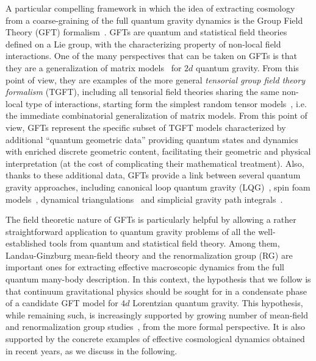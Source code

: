 \documentclass[11pt,a4paper]{article}
\begin{document}
A particular compelling framework in which the idea of extracting cosmology from a coarse-graining of the full quantum gravity dynamics is the Group Field Theory (GFT) formalism~\cite{Freidel:2005qe,Oriti:2011jm,Oriti:2007qd}. GFTs are quantum and statistical field theories defined on a Lie group, with the characterizing property of non-local field interactions. One of the many perspectives that can be taken on GFTs is that they are a generalization of matrix models~\cite{DiFrancesco:1993cyw,David:1992jw} for $2d$ quantum gravity. From this point of view, they are examples of the more general {\it tensorial group field theory formalism} (TGFT), including all tensorial field theories sharing the same non-local type of interactions, starting form the simplest random tensor models~\cite{Gurau:2011xp,GurauBook}, i.e. the immediate combinatorial generalization of matrix models. From this point of view, GFTs represent the specific subset of TGFT models characterized by additional \enquote{quantum geometric data} providing quantum states and dynamics with enriched discrete geometric content, facilitating their geometric and physical interpretation (at the cost of complicating their mathematical treatment). Also, thanks to these additional data, GFTs provide a link between several quantum gravity approaches, including canonical loop quantum gravity (LQG)~\cite{Thiemann:2007pyv,Rovelli:2004tv,Ashtekar:2004eh,Ashtekar:2021kfp}, spin foam models~\cite{Perez:2003vx,Perez:2012wv,Rovelli:2014ssa, Finocchiaro:2018hks}, dynamical triangulations~\cite{Ambjorn:2001cv,Gorlich:2013hu,Ambjorn:2013tki,Loll:2019rdj} and simplicial gravity path integrals~\cite{Reisenberger:1997sk,Freidel:1998pt,Baratin:2011hp,Finocchiaro:2018hks}.

The field theoretic nature of GFTs is particularly helpful by allowing a rather straightforward application to quantum gravity problems of all the well-established tools from quantum and statistical field theory. Among them, Landau-Ginzburg mean-field theory and the renormalization group (RG) are important ones for extracting effective macroscopic dynamics from the full quantum many-body description. 
In this context, the hypothesis that we follow is that continuum gravitational physics should be sought for in a condensate phase of a candidate GFT model for $4d$ Lorentzian quantum gravity. This hypothesis, while remaining such, is increasingly supported by growing number of mean-field~\cite{Pithis:2018eaq,Pithis:2019mlv,Marchetti:2021fix,Marchetti:2021xyz} and renormalization group studies~\cite{Benedetti:2015et,BenGeloun:2015ej,Benedetti:2016db,BenGeloun:2016kw,Carrozza:2016tih,Carrozza:2017vkz,BenGeloun:2018ekd,Pithis:2020kio,Pithis:2020sxm,Lahoche:2021nba}, from the more formal perspective. It is also supported by the concrete examples of effective cosmological dynamics obtained in recent years, as we discuss in the following. 
\end{document}
